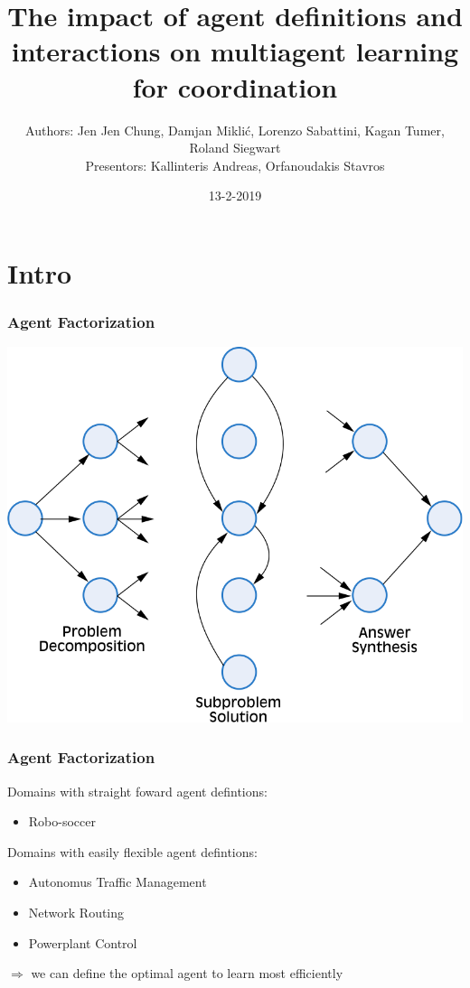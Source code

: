 \documentclass{beamer}
\title{The impact of agent definitions and interactions on multiagent learning for coordination} %
\author{Authors: Jen Jen Chung, Damjan Miklić, Lorenzo Sabattini, Kagan Tumer, Roland Siegwart
\\ Presentors: Kallinteris Andreas, Orfanoudakis Stavros}
\date{13-2-2019} %
\begin{document}
	\begin{frame}
		\maketitle %
	\end{frame}

	\section{Intro}
	\begin{frame}
		\frametitle{Agent Factorization}
		\includegraphics[height=0.9\textheight,width=\textwidth]{agent-factor.png}
	\end{frame}
	\begin{frame}
		\frametitle{Agent Factorization}
		Domains with straight foward agent defintions:
		\begin{itemize}
			\item Robo-soccer
		\end{itemize}
		Domains with easily flexible agent defintions:
		\begin{itemize}
			\item Autonomus Traffic Management
			\item Network Routing
			\item Powerplant Control
		\end{itemize}
		$\Rightarrow$ we can define the optimal agent to learn most efficiently
	\end{frame}
\end{document}
